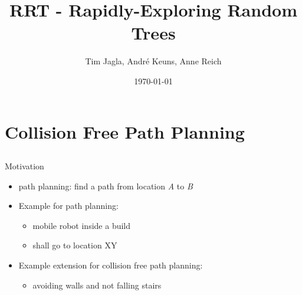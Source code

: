 \documentclass[%
  professionalfonts,%
  xcolor={%
    usenames,%
    dvipsnames,%
    svgnames,%
    table,%
    hyperref%
  }%
]{beamer}
\title{RRT - Rapidly-Exploring Random Trees}
\author{Tim Jagla, André Keuns, Anne Reich}
\institute[FIN]{Otto-von-Guericke-Universität Magdeburg}
\date{\today}
\begin{document}
  \begin{frame}
    \titlepage
  \end{frame}
  
  \section{Collision Free Path Planning}
    \begin{frame}
      \huge{}
    \end{frame}
    
    \subsection*{}
    \begin{frame}{Motivation}
      \begin{itemize}
        \item path planning: find a path from location \emph{A} to \emph{B}
        \item Example for path planning:
        \begin{itemize}
          \item mobile robot inside a build
          \item shall go to location XY
        \end{itemize}
        \item Example extension for collision free path planning:
        \begin{itemize}
          \item avoiding walls and not falling stairs
        \end{itemize}
      \end{itemize}
      
      
    \end{frame}
    
\end{document}

